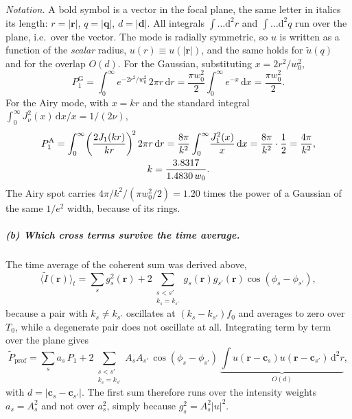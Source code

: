 \emph{Notation.} A bold symbol is a vector in the focal plane, the same letter
in italics its length: $r=|\mathbf r|$, $q=|\mathbf q|$, $d=|\mathbf d|$. All
integrals $\int\!\ldots\mathrm d^2r$ and $\int\!\ldots\mathrm d^2q$ run over the
plane, i.e.\ over the vector. The mode is radially symmetric, so $u$ is written
as a function of the \emph{scalar} radius, $u(r)\equiv u(|\mathbf r|)$, and the
same holds for $\tilde u(q)$ and for the overlap $O(d)$. For the Gaussian, substituting
$x=2r^2/w_0^2$,
\begin{equation}
P_1^\mathrm{G}=\int_0^\infty\! e^{-2r^2/w_0^2}\,2\pi r\,\mathrm dr
=\frac{\pi w_0^2}{2}\int_0^\infty\! e^{-x}\,\mathrm dx=\frac{\pi w_0^2}{2}.
\end{equation}
For the Airy mode, with $x=kr$ and the standard integral
$\int_0^\infty J_\nu^2(x)\,\mathrm dx/x=1/(2\nu)$,
\begin{gather}
P_1^\mathrm{A}=\int_0^\infty\!\left(\frac{2J_1(kr)}{kr}\right)^{\!2}2\pi r\,\mathrm dr
=\frac{8\pi}{k^2}\int_0^\infty\!\frac{J_1^2(x)}{x}\,\mathrm dx
=\frac{8\pi}{k^2}\cdot\frac12=\frac{4\pi}{k^2},\\
k=\frac{3.8317}{1.4830\,w_0}. \notag
\end{gather}
The Airy spot carries $4\pi/k^2\big/(\pi w_0^2/2)=1.20$ times the power of a
Gaussian of the same $1/e^2$ width, because of its rings.

\subparagraph{(b) Which cross terms survive the time average.}
The time average of the coherent sum was derived above,
\begin{equation}
\langle\tilde I(\mathbf r)\rangle_t=\sum_s g_s^2(\mathbf r)
+2\!\!\sum_{\substack{s<s'\\ k_s=k_{s'}}}\!\! g_s(\mathbf r)g_{s'}(\mathbf r)
\cos(\phi_s-\phi_{s'}) ,
\end{equation}
because a pair with $k_s\neq k_{s'}$ oscillates at $(k_s-k_{s'})f_0$ and
averages to zero over $T_0$, while a degenerate pair does not oscillate at all.
Integrating term by term over the plane gives
\begin{equation}
\tilde P_\mathrm{prof}=\sum_s a_s\,P_1
+2\!\!\sum_{\substack{s<s'\\ k_s=k_{s'}}}\!\!A_sA_{s'}\,
\cos(\phi_s-\phi_{s'})\,
\underbrace{\int\! u(\mathbf r-\mathbf c_s)u(\mathbf r-\mathbf c_{s'})\,
\mathrm d^2r}_{\textstyle O(d)} ,
\end{equation}
with $d=|\mathbf c_s-\mathbf c_{s'}|$. The first sum therefore runs over the
intensity weights $a_s=A_s^2$ and not over $a_s^2$, simply because
$g_s^2=A_s^2|u|^2$.

